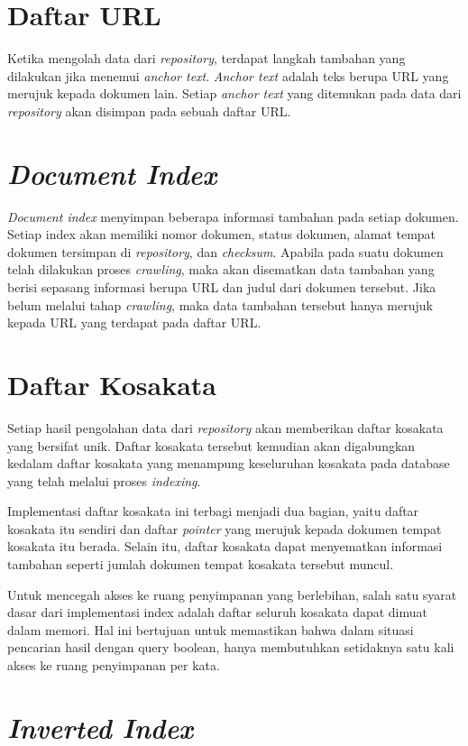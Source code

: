 \section{Daftar URL}

Ketika mengolah data dari \emph{repository}, terdapat langkah tambahan yang
dilakukan jika menemui \emph{anchor text}. \emph{Anchor text} adalah teks berupa
URL yang merujuk kepada dokumen lain. Setiap \emph{anchor text} yang ditemukan
pada data dari \emph{repository} akan disimpan pada sebuah daftar URL\@.

\section{\emph{Document Index}}
\emph{Document index} menyimpan beberapa informasi tambahan pada setiap dokumen.
Setiap index akan memiliki nomor dokumen, status dokumen, alamat tempat dokumen
tersimpan di \emph{repository}, dan \emph{checksum}. Apabila pada suatu dokumen
telah dilakukan proses \emph{crawling}, maka akan disematkan data tambahan yang
berisi sepasang informasi berupa URL dan judul dari dokumen tersebut. Jika
belum melalui tahap \emph{crawling}, maka data tambahan tersebut hanya merujuk
kepada URL yang terdapat pada daftar URL\@.

\section{Daftar Kosakata}

Setiap hasil pengolahan data dari \emph{repository} akan memberikan daftar
kosakata yang bersifat unik. Daftar kosakata tersebut kemudian akan digabungkan
kedalam daftar kosakata yang menampung keseluruhan kosakata pada database yang
telah melalui proses \emph{indexing}.

Implementasi daftar kosakata ini terbagi menjadi dua bagian, yaitu daftar
kosakata itu sendiri dan daftar \emph{pointer} yang merujuk kepada dokumen
tempat kosakata itu berada. Selain itu, daftar kosakata dapat menyematkan
informasi tambahan seperti jumlah dokumen tempat kosakata tersebut muncul.

Untuk mencegah akses ke ruang penyimpanan yang berlebihan, salah satu syarat
dasar dari implementasi index adalah daftar seluruh kosakata dapat dimuat dalam
memori. Hal ini bertujuan untuk memastikan bahwa dalam situasi pencarian hasil
dengan query boolean, hanya membutuhkan setidaknya satu kali akses ke ruang
penyimpanan per kata.

\section{\emph{Inverted Index}}


